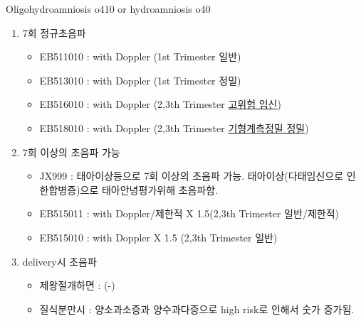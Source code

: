 \begin{commentbox}{Oligohydroamniosis o410 or hydroamniosis o40}
\begin{enumerate}\tightlist
\item 7회 정규초음파
	\begin{itemize}\tightlist
	\item EB511010 : with Doppler (1st Trimester 일반) 
	\item EB513010 : with Doppler (1st Trimester 정밀) 
	\item EB516010 : with Doppler (2,3th Trimester \uline{고위험 임신}) 
	\item EB518010 : with Doppler (2,3th Trimester \uline{기형계측정밀 정밀}) 
	\end{itemize}
\item 7회 이상의 초음파 가능
	\begin{itemize}\tightlist
	\item JX999 : 태아이상등으로 7회 이상의 초음파 가능. 태아이상(다태임신으로 인한합병증)으로 태아안녕평가위해 초음파함.
	\item EB515011 : with Doppler/제한적  X 1.5(2,3th Trimester 일반/제한적)
	\item EB515010 : with Doppler X 1.5 (2,3th Trimester 일반)
	\end{itemize}		
\item delivery시 초음파
	\begin{itemize}\tightlist
	\item 제왕절개하면 : (-)
	\item 질식분만시 : 양소과소증과 양수과다증으로 high risk로 인해서 숫가 증가됨.
	\end{itemize}
\end{enumerate}
\end{commentbox}
\par
\medskip
